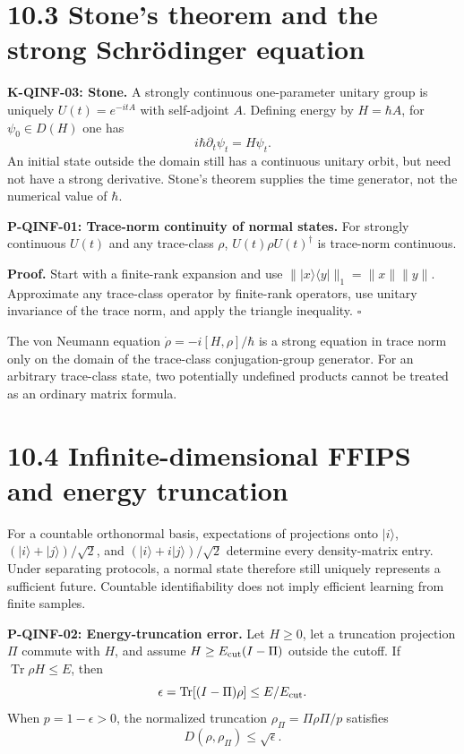 \documentclass[
  11pt,
  oneside]{book}
\begin{document}
\section{10.3 Stone's theorem and the strong Schrödinger equation}

\textbf{K-QINF-03: Stone.} A strongly continuous one-parameter unitary
group is uniquely \(U(t)=e^{-itA}\) with self-adjoint \(A\). Defining
energy by \(H=\hbar A\), for \(\psi_0\in D(H)\) one has \[
i\hbar\partial_t\psi_t=H\psi_t.
\] An initial state outside the domain still has a continuous unitary
orbit, but need not have a strong derivative. Stone's theorem supplies
the time generator, not the numerical value of \(\hbar\).

\label{p-qinf-01}{}

\textbf{P-QINF-01: Trace-norm continuity of normal states.} For strongly
continuous \(U(t)\) and any trace-class \(\rho\),
\(U(t)\rho U(t)^\dagger\) is trace-norm continuous.

\textbf{Proof.} Start with a finite-rank expansion and use
\(\||x\rangle\langle y|\|_1=\|x\|\|y\|\). Approximate any trace-class
operator by finite-rank operators, use unitary invariance of the trace
norm, and apply the triangle inequality. \(\square\)

The von Neumann equation \(\dot\rho=-i[H,\rho]/\hbar\) is a strong
equation in trace norm only on the domain of the trace-class
conjugation-group generator. For an arbitrary trace-class state, two
potentially undefined products cannot be treated as an ordinary matrix
formula.

\section{10.4 Infinite-dimensional FFIPS and energy truncation}

For a countable orthonormal basis, expectations of projections onto
\(|i\rangle\), \((|i\rangle+|j\rangle)/\sqrt2\), and
\((|i\rangle+i|j\rangle)/\sqrt2\) determine every density-matrix entry.
Under separating protocols, a normal state therefore still uniquely
represents a sufficient future. Countable identifiability does not imply
efficient learning from finite samples.

\label{p-qinf-02}{}

\textbf{P-QINF-02: Energy-truncation error.} Let \(H\ge0\), let a
truncation projection \(\Pi\) commute with \(H\), and assume
\(H\ge E_{\rm cut}(I-\Pi)\) outside the cutoff. If
\(\operatorname{Tr}\rho H\le E\), then \[
\epsilon=\operatorname{Tr}[(I-\Pi)\rho]\le E/E_{\rm cut}.
\] When \(p=1-\epsilon>0\), the normalized truncation
\(\rho_\Pi=\Pi\rho\Pi/p\) satisfies \[
D(\rho,\rho_\Pi)\le\sqrt{\epsilon}.
\]
\end{document}
